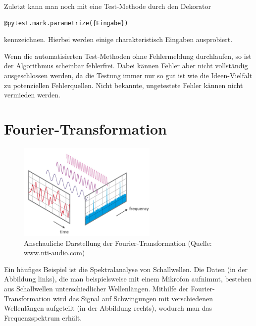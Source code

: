 \documentclass[]{dsadokumentation}
\begin{document}
Zuletzt kann man noch mit eine Test-Methode durch den Dekorator  
\begin{verbatim}
@pytest.mark.parametrize({Eingabe})
\end{verbatim}
 kennzeichnen. Hierbei werden einige charakteristisch Eingaben ausprobiert.

Wenn die automatisierten Test-Methoden ohne Fehlermeldung durchlaufen, so ist der Algorithmus scheinbar fehlerfrei. Dabei kännen Fehler aber nicht vollständig ausgeschlossen werden, da die Testung immer nur so gut ist wie die Ideen-Vielfalt zu potenziellen Fehlerquellen. Nicht bekannte, ungetestete Fehler kännen nicht vermieden werden.

\section{Fourier-Transformation}


\begin{figure}[h!]
	\centering
	\includegraphics[width=0.6\textwidth]{k4.2/fourier.png}
	\caption{Anschauliche Darstellung der Fourier-Transformation (Quelle: www.nti-audio.com)}
\end{figure}

Ein häufiges Beispiel ist die Spektralanalyse von Schallwellen. Die Daten (in der Abbildung links), die man beispielsweise mit einem Mikrofon aufnimmt, bestehen aus Schallwellen unterschiedlicher Wellenlängen. Mithilfe der Fourier-Transformation wird das Signal auf Schwingungen mit verschiedenen Wellenl\"angen aufgeteilt (in der Abbildung rechts), wodurch man das Frequenzspektrum erhält.
\end{document}
